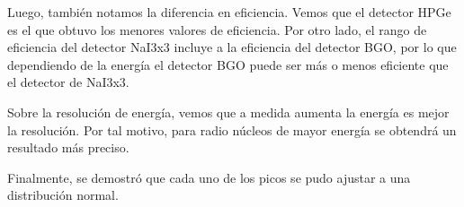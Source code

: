 \documentclass[a4paper, onecolumn]{article}
\begin{document}
		Luego, también notamos la diferencia en eficiencia. Vemos que el detector HPGe es el que obtuvo los menores valores de eficiencia. Por otro lado, el rango de eficiencia del detector NaI3x3 incluye a la eficiencia del detector BGO, por lo que dependiendo de la energía el detector BGO puede ser más o menos eficiente que el detector de NaI3x3.

		Sobre la resolución de energía, vemos que a medida aumenta la energía es mejor la resolución. Por tal motivo, para radio núcleos de mayor energía se obtendrá un resultado más preciso.

		Finalmente, se demostró que cada uno de los picos se pudo ajustar a una distribución normal.
	
	
\end{document}
